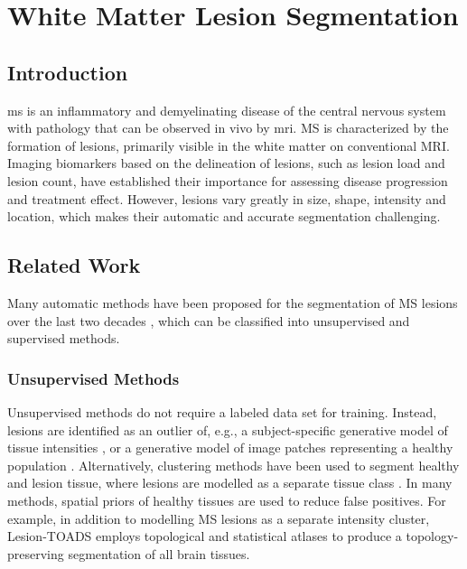 \chapter{White Matter Lesion Segmentation}
\label{sec:segmentation}

\section{Introduction}

\Gls{ms} is an inflammatory and demyelinating disease of the central nervous
system with pathology that can be observed in vivo by \gls{mri}.
MS is characterized by the formation of lesions, primarily visible in the white
matter on conventional MRI. Imaging biomarkers based on the delineation of
lesions, such as lesion load and lesion count, have established their importance
for assessing disease progression and treatment effect. However, lesions vary
greatly in size, shape, intensity and location, which makes their automatic and
accurate segmentation challenging.

\section[Related work]{Related Work}

Many automatic methods have been proposed for the segmentation of MS
\mbox{lesions} over the last two decades \citep{garcia2013}, which can be
classified into unsupervised and supervised methods.

\subsection[Unsupervised methods]{Unsupervised Methods}

Unsupervised methods do not require a labeled data set for training. Instead,
lesions are identified as an outlier of, e.g., a subject-specific generative
model of tissue intensities
\citep{vanleemput2001,tomas2015,schmidt2012,roura2015}, or a generative
model of image patches representing a healthy population \citep{weiss2013}.
Alternatively, clustering methods have been used to segment healthy and lesion
tissue, where lesions are modelled as a separate tissue class
\citep{shiee2010,sudre2015}. In many methods, spatial priors of healthy
tissues are used to reduce false positives. For example, in addition to
modelling MS lesions as a separate intensity cluster, Lesion-TOADS
\citep{shiee2010} employs topological and statistical atlases to produce
a topology-preserving segmentation of all brain tissues.

